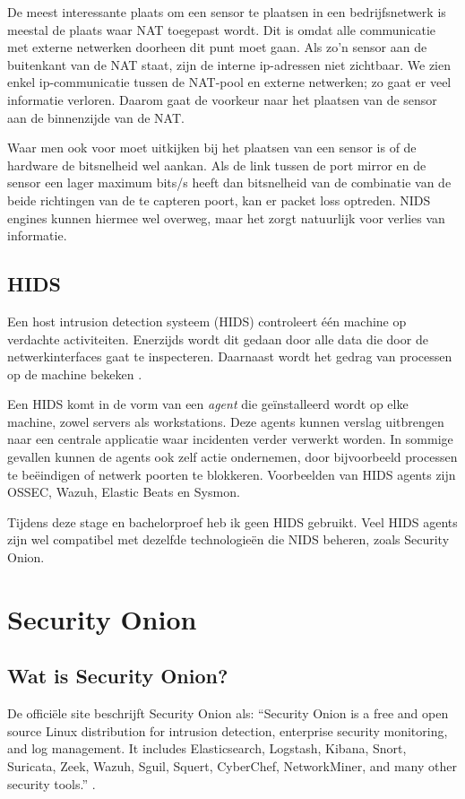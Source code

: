 \documentclass[a4paper,12pt]{report}
\begin{document}
De meest interessante plaats om een sensor te plaatsen in een bedrijfsnetwerk is meestal de plaats waar NAT toegepast wordt.
Dit is omdat alle communicatie met externe netwerken doorheen dit punt moet gaan.
Als zo'n sensor aan de buitenkant van de NAT staat, zijn de interne ip-adressen niet zichtbaar.
We zien enkel ip-communicatie tussen de NAT-pool en externe netwerken; zo gaat er veel informatie verloren.
Daarom gaat de voorkeur naar het plaatsen van de sensor aan de binnenzijde van de NAT.

Waar men ook voor moet uitkijken bij het plaatsen van een sensor is of de hardware de bitsnelheid wel aankan.
Als de link tussen de port mirror en de sensor een lager maximum bits/s heeft dan bitsnelheid van de combinatie van de beide richtingen van de te capteren poort, kan er packet loss optreden.
NIDS engines kunnen hiermee wel overweg, maar het zorgt natuurlijk voor verlies van informatie.

\section{HIDS}
Een host intrusion detection systeem (HIDS) controleert één machine op verdachte activiteiten.
Enerzijds wordt dit gedaan door alle data die door de netwerkinterfaces gaat te inspecteren.
Daarnaast wordt het gedrag van processen op de machine bekeken \autocite{wikipedia:hids}.

Een HIDS komt in de vorm van een \emph{agent} die geïnstalleerd wordt op elke machine, zowel servers als workstations.
Deze agents kunnen verslag uitbrengen naar een centrale applicatie waar incidenten verder verwerkt worden.
In sommige gevallen kunnen de agents ook zelf actie ondernemen, door bijvoorbeeld processen te beëindigen of netwerk poorten te blokkeren.
Voorbeelden van HIDS agents zijn OSSEC, Wazuh, Elastic Beats en Sysmon.

Tijdens deze stage en bachelorproef heb ik geen HIDS gebruikt.
Veel HIDS agents zijn wel compatibel met dezelfde technologieën die NIDS beheren, zoals Security Onion.

\chapter{Security Onion}
\section{Wat is Security Onion?}
De officiële site beschrijft Security Onion als:
``Security Onion is a free and open source Linux distribution for intrusion detection, enterprise security monitoring, and log management.
It includes Elasticsearch, Logstash, Kibana, Snort, Suricata, Zeek, Wazuh, Sguil, Squert, CyberChef, NetworkMiner, and many other security tools.'' \autocite{so:docs}.
\end{document}
